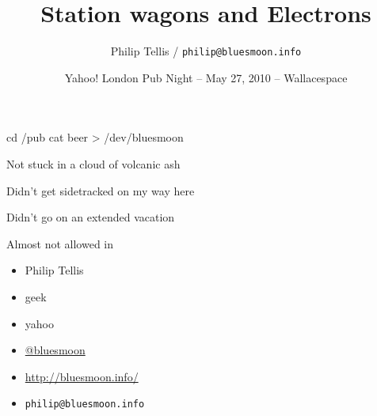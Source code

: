\documentclass{beamer}
\author{Philip Tellis / \texttt{philip@bluesmoon.info}}
\title{Station wagons and Electrons}
\date{Yahoo! London Pub Night -- May 27, 2010 -- Wallacespace}
\begin{document}
\begin{frame}[fragile]{}
  \begin{semiverbatim}
  \Large{
     cd /pub
     cat beer > /dev/bluesmoon
   }
  \end{semiverbatim}
\end{frame}

\begin{frame}{Not stuck in a cloud of volcanic ash}
\end{frame}

\begin{frame}{Didn't get sidetracked on my way here}
\end{frame}

\begin{frame}{Didn't go on an extended vacation}
\end{frame}

\begin{frame}{Almost not allowed in}
\end{frame}

\begin{frame}{}
  \begin{itemize}
  \item Philip Tellis
  \item geek
  \item yahoo
  \item \href{http://twitter.com/bluesmoon}{@bluesmoon}
  \item \href{http://bluesmoon.info/}{http://bluesmoon.info/}
  \item \small{\texttt{philip@bluesmoon.info}}
  \end{itemize}
\end{frame}
\end{document}
